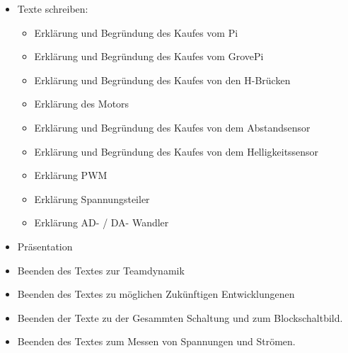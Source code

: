 \documentclass{article}
\begin{document}
\begin{itemize}

\item Texte schreiben:
\begin{itemize}

\item Erkl\"{a}rung und Begr\"{u}ndung des Kaufes vom Pi

\item Erkl\"{a}rung und Begr\"{u}ndung des Kaufes vom GrovePi

\item Erkl\"{a}rung und Begr\"{u}ndung des Kaufes von den H-Br\"{u}cken

\item Erkl\"{a}rung des Motors

\item Erkl\"{a}rung und Begr\"{u}ndung des Kaufes von dem Abstandsensor

\item Erkl\"{a}rung und Begr\"{u}ndung des Kaufes von dem Helligkeitssensor

\item Erkl\"{a}rung PWM

\item Erkl\"{a}rung Spannungsteiler

\item Erkl\"{a}rung AD- / DA- Wandler

\end{itemize}

\item Pr\"{a}sentation

\item Beenden des Textes zur Teamdynamik

\item Beenden des Textes zu m\"{o}glichen Zuk\"{u}nftigen Entwicklungenen 

\item Beenden der Texte zu der Gesammten Schaltung und zum Blockschaltbild.

\item Beenden des Textes zum Messen von Spannungen und Str\"{o}men.

\end{itemize}
\end{document}
